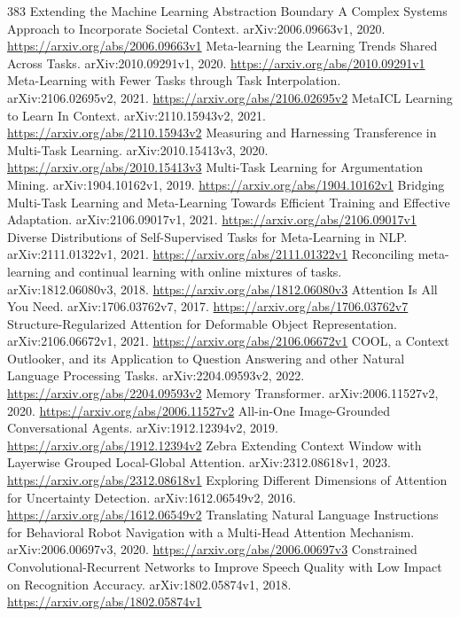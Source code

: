 \documentclass[11pt]{article}
\begin{document}
\begin{thebibliography}{383}
 Extending the Machine Learning Abstraction Boundary A Complex Systems Approach to Incorporate Societal Context. arXiv:2006.09663v1, 2020. \url{https://arxiv.org/abs/2006.09663v1}
 Meta-learning the Learning Trends Shared Across Tasks. arXiv:2010.09291v1, 2020. \url{https://arxiv.org/abs/2010.09291v1}
 Meta-Learning with Fewer Tasks through Task Interpolation. arXiv:2106.02695v2, 2021. \url{https://arxiv.org/abs/2106.02695v2}
 MetaICL Learning to Learn In Context. arXiv:2110.15943v2, 2021. \url{https://arxiv.org/abs/2110.15943v2}
 Measuring and Harnessing Transference in Multi-Task Learning. arXiv:2010.15413v3, 2020. \url{https://arxiv.org/abs/2010.15413v3}
 Multi-Task Learning for Argumentation Mining. arXiv:1904.10162v1, 2019. \url{https://arxiv.org/abs/1904.10162v1}
 Bridging Multi-Task Learning and Meta-Learning Towards Efficient Training and Effective Adaptation. arXiv:2106.09017v1, 2021. \url{https://arxiv.org/abs/2106.09017v1}
 Diverse Distributions of Self-Supervised Tasks for Meta-Learning in NLP. arXiv:2111.01322v1, 2021. \url{https://arxiv.org/abs/2111.01322v1}
 Reconciling meta-learning and continual learning with online mixtures of tasks. arXiv:1812.06080v3, 2018. \url{https://arxiv.org/abs/1812.06080v3}
 Attention Is All You Need. arXiv:1706.03762v7, 2017. \url{https://arxiv.org/abs/1706.03762v7}
 Structure-Regularized Attention for Deformable Object Representation. arXiv:2106.06672v1, 2021. \url{https://arxiv.org/abs/2106.06672v1}
 COOL, a Context Outlooker, and its Application to Question Answering and other Natural Language Processing Tasks. arXiv:2204.09593v2, 2022. \url{https://arxiv.org/abs/2204.09593v2}
 Memory Transformer. arXiv:2006.11527v2, 2020. \url{https://arxiv.org/abs/2006.11527v2}
 All-in-One Image-Grounded Conversational Agents. arXiv:1912.12394v2, 2019. \url{https://arxiv.org/abs/1912.12394v2}
 Zebra Extending Context Window with Layerwise Grouped Local-Global Attention. arXiv:2312.08618v1, 2023. \url{https://arxiv.org/abs/2312.08618v1}
 Exploring Different Dimensions of Attention for Uncertainty Detection. arXiv:1612.06549v2, 2016. \url{https://arxiv.org/abs/1612.06549v2}
 Translating Natural Language Instructions for Behavioral Robot Navigation with a Multi-Head Attention Mechanism. arXiv:2006.00697v3, 2020. \url{https://arxiv.org/abs/2006.00697v3}
 Constrained Convolutional-Recurrent Networks to Improve Speech Quality with Low Impact on Recognition Accuracy. arXiv:1802.05874v1, 2018. \url{https://arxiv.org/abs/1802.05874v1}

\end{thebibliography}
\end{document}

